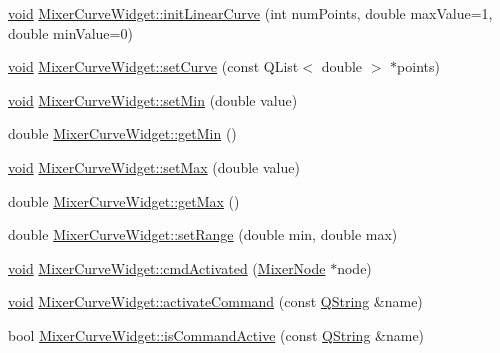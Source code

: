 \begin{DoxyCompactItemize}
\item 
\hyperlink{group___u_a_v_objects_plugin_ga444cf2ff3f0ecbe028adce838d373f5c}{void} \hyperlink{group___u_a_v_object_widget_utils_gad0a76288e7cbdf09fb112176d236dfde}{\-Mixer\-Curve\-Widget\-::init\-Linear\-Curve} (int num\-Points, double max\-Value=1, double min\-Value=0)
\item 
\hyperlink{group___u_a_v_objects_plugin_ga444cf2ff3f0ecbe028adce838d373f5c}{void} \hyperlink{group___u_a_v_object_widget_utils_ga0738fd8e0cf67713c6553da77c284a71}{\-Mixer\-Curve\-Widget\-::set\-Curve} (const \-Q\-List$<$ double $>$ $\ast$points)
\item 
\hyperlink{group___u_a_v_objects_plugin_ga444cf2ff3f0ecbe028adce838d373f5c}{void} \hyperlink{group___u_a_v_object_widget_utils_ga78338911bd3605c13be6672b2a94d346}{\-Mixer\-Curve\-Widget\-::set\-Min} (double value)
\item 
double \hyperlink{group___u_a_v_object_widget_utils_gac199a42260bf4a3ddd42f23bae109569}{\-Mixer\-Curve\-Widget\-::get\-Min} ()
\item 
\hyperlink{group___u_a_v_objects_plugin_ga444cf2ff3f0ecbe028adce838d373f5c}{void} \hyperlink{group___u_a_v_object_widget_utils_ga5575aabae9b71223eefe3e0a2ad39191}{\-Mixer\-Curve\-Widget\-::set\-Max} (double value)
\item 
double \hyperlink{group___u_a_v_object_widget_utils_ga34c76c8602acb8377ecaead69dd32bd0}{\-Mixer\-Curve\-Widget\-::get\-Max} ()
\item 
double \hyperlink{group___u_a_v_object_widget_utils_ga282a2d6417e079ff34450ffb620f9898}{\-Mixer\-Curve\-Widget\-::set\-Range} (double min, double max)
\item 
\hyperlink{group___u_a_v_objects_plugin_ga444cf2ff3f0ecbe028adce838d373f5c}{void} \hyperlink{group___u_a_v_object_widget_utils_ga1846362502f57645af53b826ee5537ad}{\-Mixer\-Curve\-Widget\-::cmd\-Activated} (\hyperlink{class_mixer_node}{\-Mixer\-Node} $\ast$node)
\item 
\hyperlink{group___u_a_v_objects_plugin_ga444cf2ff3f0ecbe028adce838d373f5c}{void} \hyperlink{group___u_a_v_object_widget_utils_gad39c4c8427b031af1e9042f750301ec8}{\-Mixer\-Curve\-Widget\-::activate\-Command} (const \hyperlink{group___u_a_v_objects_plugin_gab9d252f49c333c94a72f97ce3105a32d}{\-Q\-String} \&name)
\item 
bool \hyperlink{group___u_a_v_object_widget_utils_ga3922cc5ec0cc7ce3937fbbd2199c1170}{\-Mixer\-Curve\-Widget\-::is\-Command\-Active} (const \hyperlink{group___u_a_v_objects_plugin_gab9d252f49c333c94a72f97ce3105a32d}{\-Q\-String} \&name)

\end{DoxyCompactItemize}
